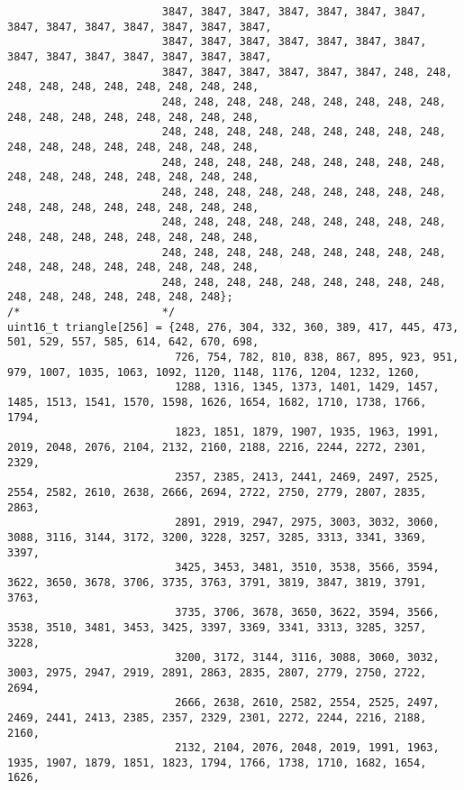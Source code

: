 \begin{code}
\begin{verbatim}
                        3847, 3847, 3847, 3847, 3847, 3847, 3847, 3847, 3847, 3847, 3847, 3847, 3847, 3847,
                        3847, 3847, 3847, 3847, 3847, 3847, 3847, 3847, 3847, 3847, 3847, 3847, 3847, 3847,
                        3847, 3847, 3847, 3847, 3847, 3847, 248, 248, 248, 248, 248, 248, 248, 248, 248, 248,
                        248, 248, 248, 248, 248, 248, 248, 248, 248, 248, 248, 248, 248, 248, 248, 248, 248,
                        248, 248, 248, 248, 248, 248, 248, 248, 248, 248, 248, 248, 248, 248, 248, 248, 248,
                        248, 248, 248, 248, 248, 248, 248, 248, 248, 248, 248, 248, 248, 248, 248, 248, 248,
                        248, 248, 248, 248, 248, 248, 248, 248, 248, 248, 248, 248, 248, 248, 248, 248, 248,
                        248, 248, 248, 248, 248, 248, 248, 248, 248, 248, 248, 248, 248, 248, 248, 248, 248,
                        248, 248, 248, 248, 248, 248, 248, 248, 248, 248, 248, 248, 248, 248, 248, 248, 248,
                        248, 248, 248, 248, 248, 248, 248, 248, 248, 248, 248, 248, 248, 248, 248, 248};
/*                      */
uint16_t triangle[256] = {248, 276, 304, 332, 360, 389, 417, 445, 473, 501, 529, 557, 585, 614, 642, 670, 698,
                          726, 754, 782, 810, 838, 867, 895, 923, 951, 979, 1007, 1035, 1063, 1092, 1120, 1148, 1176, 1204, 1232, 1260,
                          1288, 1316, 1345, 1373, 1401, 1429, 1457, 1485, 1513, 1541, 1570, 1598, 1626, 1654, 1682, 1710, 1738, 1766, 1794,
                          1823, 1851, 1879, 1907, 1935, 1963, 1991, 2019, 2048, 2076, 2104, 2132, 2160, 2188, 2216, 2244, 2272, 2301, 2329,
                          2357, 2385, 2413, 2441, 2469, 2497, 2525, 2554, 2582, 2610, 2638, 2666, 2694, 2722, 2750, 2779, 2807, 2835, 2863,
                          2891, 2919, 2947, 2975, 3003, 3032, 3060, 3088, 3116, 3144, 3172, 3200, 3228, 3257, 3285, 3313, 3341, 3369, 3397,
                          3425, 3453, 3481, 3510, 3538, 3566, 3594, 3622, 3650, 3678, 3706, 3735, 3763, 3791, 3819, 3847, 3819, 3791, 3763,
                          3735, 3706, 3678, 3650, 3622, 3594, 3566, 3538, 3510, 3481, 3453, 3425, 3397, 3369, 3341, 3313, 3285, 3257, 3228,
                          3200, 3172, 3144, 3116, 3088, 3060, 3032, 3003, 2975, 2947, 2919, 2891, 2863, 2835, 2807, 2779, 2750, 2722, 2694,
                          2666, 2638, 2610, 2582, 2554, 2525, 2497, 2469, 2441, 2413, 2385, 2357, 2329, 2301, 2272, 2244, 2216, 2188, 2160,
                          2132, 2104, 2076, 2048, 2019, 1991, 1963, 1935, 1907, 1879, 1851, 1823, 1794, 1766, 1738, 1710, 1682, 1654, 1626,

\end{verbatim}
\end{code}
